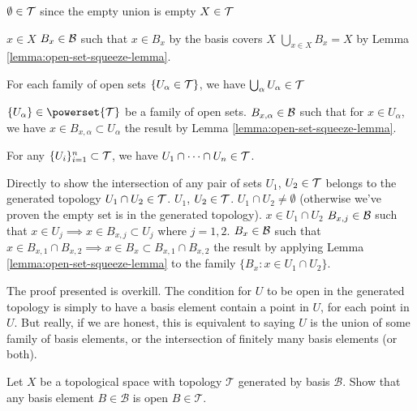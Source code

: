\begin{spf}
  \step $\emptyset\in\mathcal{T}$ since the empty union is empty
  \step $X\in\mathcal{T}$
  \begin{spf}
    \Let $x\in X$
    \Consider $B_{x}\in\mathcal{B}$ such that $x\in B_{x}$ by the basis
    covers $X$
    \Hence $\bigcup_{x\in X}B_{x}=X$ by Lemma \ref{lemma:open-set-squeeze-lemma}.
  \end{spf}
  \step For each family of open sets $\{U_{\alpha}\in\mathcal{T}\}$,
  we have $\bigcup_{\alpha}U_{\alpha}\in\mathcal{T}$
  \begin{spf}
    \Let $\{U_{\alpha}\}\in\powerset{\topology{T}}$ be a family of open
    sets.
    \Consider $B_{x,\alpha}\in\mathcal{B}$ such that for $x\in U_{\alpha}$,
    we have $x\in B_{x,\alpha}\subset U_{\alpha}$
    \Hence the result by Lemma \ref{lemma:open-set-squeeze-lemma}.
  \end{spf}
  \step For any $\{U_{i}\}_{i=1}^{n}\subset\mathcal{T}$, we have
  $U_{1}\cap\dots\cap U_{n}\in\mathcal{T}$.
  \begin{spf}
    Directly
    \Suffices to show the intersection of any pair of sets $U_{1}$,
    $U_{2}\in\mathcal{T}$ belongs to the generated topology
    $U_{1}\cap U_{2}\in\mathcal{T}$.
    \Let $U_{1}$, $U_{2}\in\mathcal{T}$.
    \Assume $U_{1}\cap U_{2}\neq\emptyset$ (otherwise we've proven the
    empty set is in the generated topology).
    \Let $x\in U_{1}\cap U_{2}$
    \Consider $B_{x,j}\in\mathcal{B}$ such that
    $x\in U_{j}\implies x\in B_{x,j}\subset U_{j}$ where $j=1,2$.
    \Consider $B_{x}\in\mathcal{B}$ such that
    $x\in B_{x,1}\cap B_{x,2}\implies x\in B_{x}\subset B_{x,1}\cap B_{x,2}$
    \Hence the result by applying Lemma \ref{lemma:open-set-squeeze-lemma}
    to the family $\{B_{x} : x\in U_{1}\cap U_{2}\}$.\placeQED{}
  \end{spf}
\end{spf}

The proof presented is overkill. The condition for $U$ to be open in the
generated topology is simply to have a basis element contain a point
in $U$, for each point in $U$. But really, if we are honest, this is
equivalent to saying $U$ is the union of some family of basis elements,
or the intersection of finitely many basis elements (or both).

Let $X$ be a topological space with topology $\mathcal{T}$ generated by
basis $\mathcal{B}$. Show that any basis element $B\in\mathcal{B}$ is
open $B\in\mathcal{T}$.


